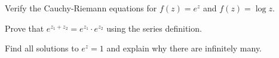 \begin{exercise}
Verify the Cauchy-Riemann equations for $f(z) = e^z$ and $f(z) = \log z$.
\end{exercise}

\begin{exercise}
Prove that $e^{z_1 + z_2} = e^{z_1} \cdot e^{z_2}$ using the series definition.
\end{exercise}

\begin{exercise}
Find all solutions to $e^z = 1$ and explain why there are infinitely many.
\end{exercise}
